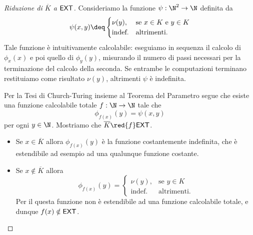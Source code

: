 \documentclass[
    a4paper,
    language=italian,
    oneside,
    10pt,
    article,
    thmstyle=professional
]{notes}
\renewcommand{\compl}[1]{\overline{#1}}
\newcommand{\EXT}{\normalfont\textsf{EXT}}
\newcommand{\indef}{\text{indef.}}
\newcommand{\altr}{\text{altrimenti}}
\begin{document}
    \begin{proof}[Riduzione di $\compl{K}$ a $\EXT$]
        Consideriamo la funzione $\psi : \N^2 \to \N$ definita da \[
            \psi(x, y) \deq \begin{cases}
                \nu(y), &\text{se $x \in K$ e $y \in K$}\\
                \indef &\altr.
            \end{cases}
        \]
        Tale funzione è intuitivamente calcolabile: eseguiamo in sequenza
        il calcolo di $\phi_x(x)$ e poi quello di $\phi_y(y)$, misurando
        il numero di passi necessari per la terminazione del calcolo della
        seconda. Se entrambe le computazioni terminano restituiamo come
        risultato $\nu(y)$, altrimenti $\psi$ è indefinita.   
        
        Per la Tesi di Church-Turing insieme al Teorema del Parametro
        segue che esiste una funzione calcolabile totale $f : \N \to \N$
        tale che \[
            \phi_{f(x)}(y) = \psi(x, y)
        \] per ogni $y \in \N$. Mostriamo che $\compl{K} \red{f} \EXT$.
        \begin{itemize}[label={\tiny\raisebox{1ex}{\textbullet}}]
            \item Se $x \in \compl{K}$ allora $\phi_{f(x)}(y)$ è la
            funzione costantemente indefinita, che è estendibile ad esempio
            ad una qualunque funzione costante.
            \item Se $x \notin \compl{K}$ allora \[
                \phi_{f(x)}(y) = \begin{cases}
                    \nu(y), &\text{se $y \in K$}\\
                    \indef  &\altr.
                \end{cases}
            \] Per il  questa funzione non è estendibile
            ad una funzione calcolabile totale, e dunque $f(x) \notin \EXT$. \qedhere
        \end{itemize}  
    \end{proof}
\end{document}
